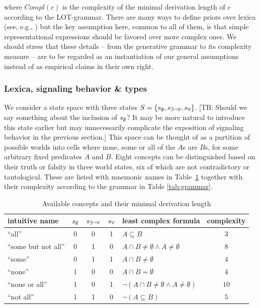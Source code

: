 \documentclass[a4paper, 11pt]{article}
\newcommand{\tb}[1]{\textcolor[rgb]{.8,.33,.0}{[TB: #1]}}%
\newcommand{\set}[1]{\left\{#1\right\}}
\newcommand{\States}{\ensuremath{S}\xspace}		%
\newcommand{\state}{\ensuremath{s}\xspace}		%
\newcommand{\mystate}[1]{\ensuremath{\state_{\text{#1}}}\xspace} %
\newcommand{\ssome}{\mystate{\ensuremath{\exists\neg\forall}}}
\newcommand{\sall}{\mystate{\ensuremath{\forall}}}
\newcommand{\snone}{\mystate{\ensuremath{\emptyset}}}
\begin{document}
where $Compl(c)$ is the complexity of the minimal derivation length of $c$ according to the LOT-grammar. There are many ways to define priors over lexica (see, e.g., \citealt{goodman+etal:2008, piantadosi+etal:2012a}) but the key assumption here, common to all of them, is that simple representational expressions should be favored over more complex ones. We should stress that these details -- from the generative grammar to its complexity measure -- are to be regarded as an instantiation of our general assumptions instead of as empirical claims in their own right. 




\subsubsection{Lexica, signaling behavior \& types}
We consider a state space with three states $\States = \set{\snone, \ssome, \sall}$. \tb{Should we say something about the inclusion of $\snone$? It may be more natural to introduce this state earlier but may unnecessarily complicate the exposition of signaling behavior in the previous section.} This space can be
thought of as a partition of possible worlds into cells where none, some or all of the $A$s are
$B$s, for some arbitrary fixed predicates $A$ and $B$. Eight concepts can be distinguished
based on their truth or falsity in three world states, six of which are not contradictory
 or tautological. These are listed with mnemonic names in
Table~\ref{tab:concepts} together with their complexity according to the grammar in Table \ref{tab:grammar}.

\begin{table}
  \centering
\begin{center}
  \begin{tabular}{lccclc}
    \toprule
    intuitive name
    & \snone
    & \ssome
    & \sall
    & least complex formula
    & complexity
    \\ \midrule
    ``all''
    & 0
    & 0
    & 1
    & $A \subseteq B$
    & $3$
    \\
    ``some but not all''
    & 0
    & 1
    & 0
    & $A \cap B \neq \emptyset \wedge A \neq \emptyset$
    & $8$
    \\    
    ``some''
    & 0
    & 1
    & 1
    & $A \cap B \neq \emptyset$
    & $4$
    \\
    ``none''
    & 1
    & 0
    & 0
    & $A \cap B = \emptyset$
    & $4$
    \\
    ``none or all''
    & 1
    & 0
    & 1
    & $\neg(A \cap B \neq \emptyset \wedge A \neq \emptyset)$
    & $10$
    \\
    ``not all''
    & 1
    & 1
    & 0
    & $\neg (A \subseteq B)$
    & $5$
    \\
    \bottomrule
  \end{tabular}
\end{center}
\caption{Available concepts and their minimal derivation length}
\label{tab:concepts}
\end{table}
\end{document}
